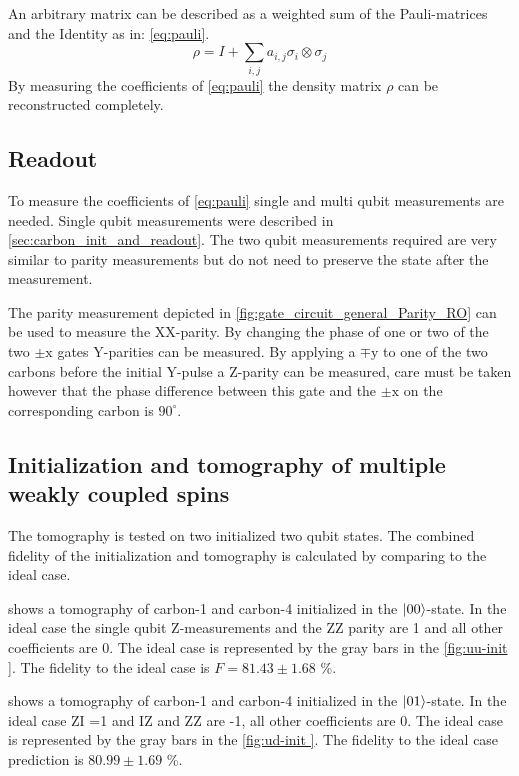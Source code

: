 An arbitrary matrix can be described as a weighted sum of the Pauli-matrices and the Identity as in: \cref{eq:pauli}.
\begin{equation}
    \rho = I + \sum_{i,j} a_{i,j} \sigma_i \otimes \sigma_j
    \label{eq:pauli}
\end{equation}
By measuring the coefficients of \cref{eq:pauli}  the density matrix $\rho$ can be reconstructed completely.


\subsection{Readout}
To measure the coefficients of \cref{eq:pauli} single and multi qubit measurements are needed.
Single qubit measurements were described in \cref{sec:carbon_init_and_readout}.
The two qubit measurements required are very similar to parity measurements but do not need to preserve the state after the measurement.

The parity measurement depicted in \cref{fig:gate_circuit_general_Parity_RO} can be used to measure the XX-parity.
By changing the phase of one or two of the two $\pm \mathrm{x}$ gates Y-parities can be measured.
By applying a $\mp \mathrm{y}$ to one of the two carbons before the initial Y-pulse a Z-parity can be measured, care must be taken however that the phase difference between this gate and the $\pm \mathrm{x}$ on the corresponding carbon is $90^\circ$.

\subsection{Initialization and tomography of multiple weakly coupled spins}
The tomography is tested on two initialized two qubit states.
The combined fidelity of the initialization and tomography is calculated by comparing to the ideal case.

 shows a tomography of carbon-1 and carbon-4 initialized in the ${\left\vert{00}\right\rangle}$-state.
In the ideal case the single qubit Z-measurements and the ZZ parity are 1 and all other coefficients are 0.
The ideal case is represented by the gray bars in the \cref{fig:uu-init }.
The fidelity to the ideal case is $F = 81.43 \pm 1.68$ \%.

 shows a tomography of carbon-1 and carbon-4 initialized in the ${\left\vert{01}\right\rangle}$-state.
In the ideal case ZI =1 and IZ and ZZ are -1, all other coefficients are 0.
The ideal case is represented by the gray bars in the \cref{fig:ud-init }.
The fidelity to the ideal case prediction is $80.99 \pm 1.69$ \%.

